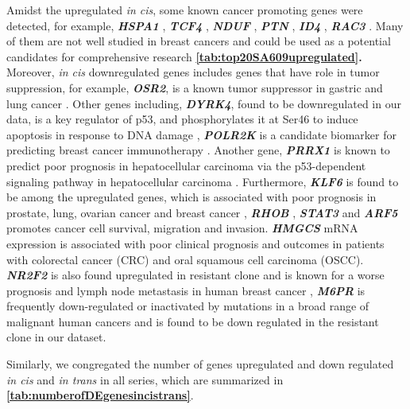 Amidst the upregulated \textit{in cis}, some known cancer promoting genes were detected, for example,  \textit{\textbf{HSPA1}} \cite{zoppino2018comprehensive},  \textit{\textbf{TCF4}} \cite{ravindranath2011wnt}, \textit{\textbf{NDUF}} \cite{li2015down}, 
\textit{\textbf{PTN}} \cite{huang2018chemotherapy},        
\textit{\textbf{ID4}} \cite{donzelli2018expression}, 
\textit{\textbf{RAC3}} \cite{donnelly2017rac3}. Many of them are not well studied in breast cancers and could be used as a potential candidates for comprehensive research \textbf{\autoref{tab:top20SA609upregulated}.}
Moreover, \textit{in cis} downregulated genes includes genes that have role in tumor suppression, for example, \textit{\textbf{OSR2}}, is a known tumor suppressor in gastric and lung cancer \cite{otani2014odd,wang2018odd}. Other genes including, \textit{\textbf{DYRK4}}, found to be downregulated in our data, is a key regulator of p53, and phosphorylates it at Ser46 to induce apoptosis in response to DNA damage \cite{yoshida2019multiple}, \textit{\textbf{POLR2K}} is a candidate biomarker for predicting breast cancer immunotherapy \cite{lopez2020prediction}. Another gene, \textit{\textbf{PRRX1}} is known to predict poor prognosis in hepatocellular carcinoma via the p53-dependent signaling pathway in hepatocellular carcinoma \cite{fan2017downregulation}. Furthermore,  
\textit{\textbf{KLF6}} is found to be among the upregulated genes, which is associated with poor prognosis in prostate, lung, ovarian cancer and 
breast cancer \cite{hatami2013klf6,difeo2009role}, 
\textit{\textit{\textbf{RHOB}}} \cite{ju2018rhob},
\textit{\textbf{STAT3}} \cite{li2019clinicopathological,kamran2013role} and 
\textit{\textbf{ARF5}} \cite{li2017roles,casalou2020role} promotes cancer cell survival, migration and invasion. \textit{\textbf{HMGCS}} \cite{chen2017hmgcs2} mRNA expression is associated with poor clinical prognosis and outcomes in patients with colorectal cancer (CRC) and oral squamous cell carcinoma (OSCC). \textit{\textbf{NR2F2}} is also found upregulated in resistant clone and is known for a worse prognosis and lymph node metastasis in human breast cancer 
\cite{erdHos2020nr2f2,xia2020nr2f2},
 \textit{\textbf{M6PR}} is frequently down-regulated or inactivated by mutations in a broad range of malignant human cancers \cite{dalle2018mannose} and is found to be down regulated in the resistant clone in our dataset. 

Similarly, we congregated the number of genes upregulated and down regulated \textit{in cis} and \textit{in trans} in all series, which are summarized in \textbf{\autoref{tab:numberofDEgenesincistrans}}.

